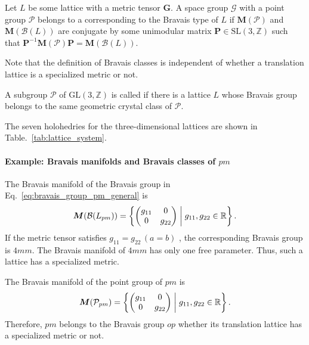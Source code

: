 \begin{screen}
  \begin{defn}
    Let $L$ be some lattice with a metric tensor $\bm{G}$.
    A space group $\mathcal{G}$ with a point group $\mathcal{P}$ belongs to a  corresponding to the Bravais type of $L$ if $\bm{M}(\mathcal{P})$ and $\bm{M}(\mathcal{B}(L))$ are conjugate by some unimodular matrix $\bm{P} \in \mathrm{SL}(3, \mathbb{Z})$ such that $\bm{P}^{-1} \bm{M}(\mathcal{P}) \bm{P} = \bm{M}(\mathcal{B}(L))$.
  \end{defn}
\end{screen}

Note that the definition of Bravais classes is independent of whether a translation lattice is a specialized metric or not.

\begin{screen}
  \begin{defn}[holohedry]
    A subgroup $\mathcal{P}$ of $\mathrm{GL}(3, \mathbb{Z})$ is called  if there is a lattice $L$ whose Bravais group belongs to the same geometric crystal class of $\mathcal{P}$.
  \end{defn}
\end{screen}

The seven holohedries for the three-dimensional lattices are shown in Table.~\ref{tab:lattice_system}.

\paragraph{Example: Bravais manifolds and Bravais classes of $pm$}

The Bravais manifold of the Bravais group in Eq.~\eqref{eq:bravais_group_pm_general} is
\begin{align*}
  \bm{M}(\mathcal{B}(L_{pm})) = \left\{ 
    \begin{pmatrix} g_{11} & 0 \\ 0 & g_{22} \end{pmatrix}
   \mathrel{}\middle|\mathrel{} 
    g_{11}, g_{22} \in \mathbb{R}
   \right\}.
\end{align*}
If the metric tensor satisfies $g_{11} = g_{22} \, (a = b)$ , the corresponding Bravais group is $4mm$.
The Bravais manifold of $4mm$ has only one free parameter.
Thus, such a lattice has a specialized metric.

The Bravais manifold of the point group of $pm$ is
\begin{align*}
  \bm{M}(\mathcal{P}_{pm}) = \left\{ 
    \begin{pmatrix} g_{11} & 0 \\ 0 & g_{22} \end{pmatrix}
   \mathrel{}\middle|\mathrel{} 
    g_{11}, g_{22} \in \mathbb{R}
   \right\}.
\end{align*}
Therefore, $pm$ belongs to the Bravais group $op$ whether its translation lattice has a specialized metric or not.

